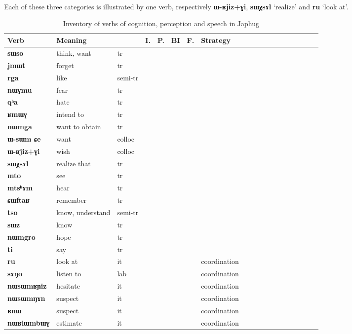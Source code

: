 \documentclass[oneside,a4paper,11pt]{article}
\newcommand{\ipa}[1]{\textbf{\phon#1}} %
\newcommand{\jpg}[2]{\ipa{#1} `#2'} %
\newcommand{\N}{}
\newcommand{\Y}{\Checkmark}
\begin{document}
 Each of these three categories is illustrated by one verb, respectively \ipa{ɯ-ʁjiz+ɣi}, \jpg{sɯχsɤl}{realize} and \jpg{ru}{look at}.
 
\begin{table}[H]
\caption{Inventory of verbs of cognition, perception and speech in Japhug} \label{tab:cognition} 
\begin{tabular}{lllllllllllllllllll}
\toprule
Verb & 	Meaning & 	 & 	I. & 	P.& 	BI & 	F. & 	Strategy & 	\\
\midrule
\ipa{sɯso} & 	think, want & 	tr  & 	\Y & 	\N & 	\N & 	\Y & 	\N & 	\\
\ipa{jmɯt} & 	forget & 	tr  & 	\Y & 	\N & 	\N & 	\Y & 	\N & 	\\
\ipa{rga} & 	like & 	semi-tr & 	\Y & 	\N & 	\N & 	\Y & 	\N & 	\\
\ipa{nɯɣmu} & 	fear & 	tr  & 	\Y & 	\N & 	\N & 	\Y & 	\N & 	\\
\ipa{qʰa} & 	hate & 	tr  & 	\Y & 	\N & 	\N & 	\Y & 	\N & 	\\
\ipa{ʁmɯɣ} & 	intend to & 	tr  & 	\Y & 	\N & 	\N & 	\Y & 	\N & 	\\
\ipa{nɯmga} & 	want to obtain & 	tr  & 	\Y & 	\N & 	\N & 	\Y & 	\N & 	\\
\ipa{ɯ-sɯm ɕe} & 	want & 	colloc & 	\Y & 	\N & 	\N & 	\Y & 	\N & 	\\
\ipa{ɯ-ʁjiz+ɣi} & 	wish & 	colloc & 	\Y & 	\N & 	\N & 	\Y & 	\N & 	\\
\midrule
\ipa{sɯχsɤl} & 	realize that & 	tr  & 	\N & 	\N & 	\N & 	\Y & 	\N & 	\\
\ipa{mto} & 	see & 	tr  & 	\N & 	\N & 	\N & 	\Y & 	\N & 	\\
\ipa{mtsʰɤm} & 	hear & 	tr  & 	\N & 	\N & 	\N & 	\Y & 	\N & 	\\
\ipa{ɕɯftaʁ} & 	remember & 	tr  & 	\N & 	\N & 	\N & 	\Y & 	\N & 	\\
\ipa{tso} & 	know, understand & 	semi-tr & 	\N & 	\N & 	\N & 	\Y & 	\N & 	\\
\ipa{sɯz} & 	know & 	tr  & 	\N & 	\N & 	\N & 	\Y & 	\N & 	\\
\ipa{nɯmgro} & 	hope & 	tr  & 	\N & 	\N & 	\N & 	\Y & 	\N & 	\\
\ipa{ti} & 	say & 	tr  & 	\N & 	\N & 	\N & 	\Y & 	\N & 	\\
\midrule
\ipa{ru} & 	look at & 	it & 	\N & 	\N & 	\N & 	\N & 	coordination & 	\\
\ipa{sɤŋo} & 	listen to & 	lab & 	\N & 	\N & 	\N & 	\N & 	coordination & 	\\
\ipa{nɯsɯmʁɲiz} & 	hesitate & 	it & 	\N & 	\N & 	\N & 	\N & 	coordination & 	\\
\ipa{nɯsɯmŋɤn} & 	suspect & 	it & 	\N & 	\N & 	\N & 	\N & 	coordination & 	\\
\ipa{ʁnɯ} & 	suspect & 	it & 	\N & 	\N & 	\N & 	\N & 	coordination & 	\\
\ipa{nɯʁlɯmbɯɣ} & 	estimate & 	it & 	\N & 	\N & 	\N & 	\N & 	coordination & 	\\
\bottomrule
\end{tabular}
\end{table}
\end{document}
